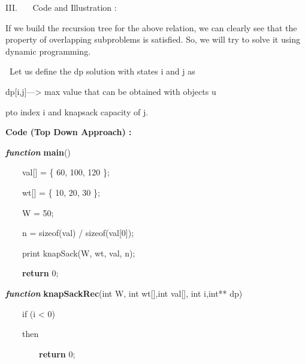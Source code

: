 \documentclass[letterpaper]{article}
\begin{document}
\bigskip
\begin{multicols}{2}
{\mdseries
III. \ \ \ Code and Illustration :}


\bigskip

If we build the recursion tree for the above relation, we can clearly see that the property of overlapping subproblems
is satisfied. So, we will try to solve it using dynamic programming.


\bigskip

\ Let us define the dp solution with states i and j as 

dp[i,j]---{\textgreater} max value that can be obtained with objects u 

pto index i and knapsack capacity of j. 


\bigskip
{\bfseries
Code (Top Down Approach) :}

\textbf{\textit{\textcolor[rgb]{0.2509804,0.25882354,0.30588236}{function}}}\textcolor[rgb]{0.2509804,0.25882354,0.30588236}{
}\textbf{\textcolor[rgb]{0.2509804,0.25882354,0.30588236}{main}}\textcolor[rgb]{0.2509804,0.25882354,0.30588236}{()}

{\color[rgb]{0.2509804,0.25882354,0.30588236}
\ \ \ \ val[] = \{ 60, 100, 120 \};}

{\color[rgb]{0.2509804,0.25882354,0.30588236}
\ \ \ \ wt[] = \{ 10, 20, 30 \};}

{\color[rgb]{0.2509804,0.25882354,0.30588236}
\ \ \ \ W = 50;}

{\color[rgb]{0.2509804,0.25882354,0.30588236}
\ \ \ \ n = sizeof(val) / sizeof(val[0]);}

{\color[rgb]{0.2509804,0.25882354,0.30588236}
\ \ \ \ print knapSack(W, wt, val, n);}

\textcolor[rgb]{0.2509804,0.25882354,0.30588236}{\ \ \ \ }\textbf{\textcolor[rgb]{0.2509804,0.25882354,0.30588236}{return}}\textcolor[rgb]{0.2509804,0.25882354,0.30588236}{
0;}


\bigskip

\textbf{\textit{\textcolor[rgb]{0.2509804,0.25882354,0.30588236}{function}}}\textcolor[rgb]{0.2509804,0.25882354,0.30588236}{
}\textbf{\textcolor[rgb]{0.2509804,0.25882354,0.30588236}{knapSackRec}}\textcolor[rgb]{0.2509804,0.25882354,0.30588236}{(int
W, int wt[],int val[], int i,int** dp)}

{\color[rgb]{0.2509804,0.25882354,0.30588236}
\ \ \ \ if (i {\textless} 0)}

{\color[rgb]{0.2509804,0.25882354,0.30588236}
\ \ \ \ then}

\textcolor[rgb]{0.2509804,0.25882354,0.30588236}{\ \ \ \ \ \ \ \ }\textbf{\textcolor[rgb]{0.2509804,0.25882354,0.30588236}{return}}\textcolor[rgb]{0.2509804,0.25882354,0.30588236}{
0;}


\end{multicols}
\end{document}
